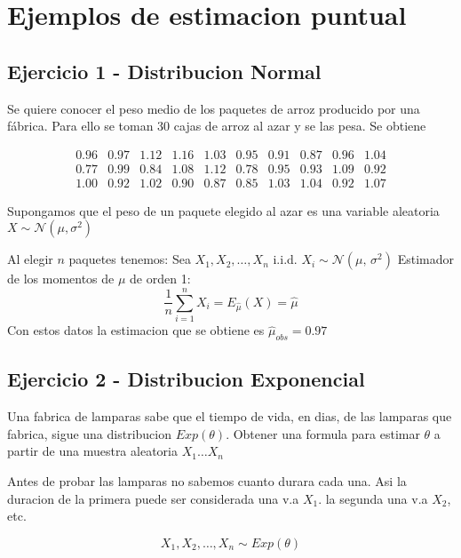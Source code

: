 \documentclass[a4paper]{article}
\begin{document}
\section{Ejemplos de estimacion puntual}

\subsection{Ejercicio 1 - Distribucion Normal}
Se quiere conocer el peso medio de los paquetes de arroz producido por una fábrica. Para ello se toman 30 cajas
de arroz al azar y se las pesa. Se obtiene

\begin{equation*}
    \begin{matrix}
        0.96 & 0.97 & 1.12 & 1.16 & 1.03 & 0.95 & 0.91 & 0.87 & 0.96 & 1.04 \\
        0.77 & 0.99 & 0.84 & 1.08 & 1.12 & 0.78 & 0.95 & 0.93 & 1.09 & 0.92 \\
        1.00 & 0.92 & 1.02 & 0.90 & 0.87 & 0.85 & 1.03 & 1.04 & 0.92 & 1.07
    \end{matrix}
\end{equation*}

Supongamos que el peso de un paquete elegido al azar es una variable aleatoria $X \sim \mathcal{N}(\mu,\sigma^2)$

Al elegir $n$ paquetes tenemos: Sea $X_{1},X_{2},\dots,X_{n}$ i.i.d. $X_{i} \sim \mathcal{N}(\mu,\,\sigma^{2})$
Estimador de los momentos de $\mu$ de orden 1:
\begin{equation*}
    \frac{1}{n} \sum_{i=1}^n X_{i} = E_{\widehat{\mu}}(X) = \widehat{\mu}
\end{equation*}
Con estos datos la estimacion que se obtiene es $\widehat{\mu}_{obs} = 0.97$

\subsection{Ejercicio 2 - Distribucion Exponencial}
Una fabrica de lamparas sabe que el tiempo de vida, en dias, de las lamparas que fabrica, sigue una distribucion $Exp(\theta)$.
Obtener una formula para estimar $\theta$ a partir de una muestra aleatoria $X_{1}\dots X_{n}$

Antes de probar las lamparas no sabemos cuanto durara cada una. Asi la duracion de la primera puede ser considerada
una v.a $X_{1}$. la segunda una v.a $X_{2}$, etc. 

\begin{equation*}
    X_{1}, X_{2}, \dots, X_{n} \sim Exp(\theta)
\end{equation*}
\end{document}
